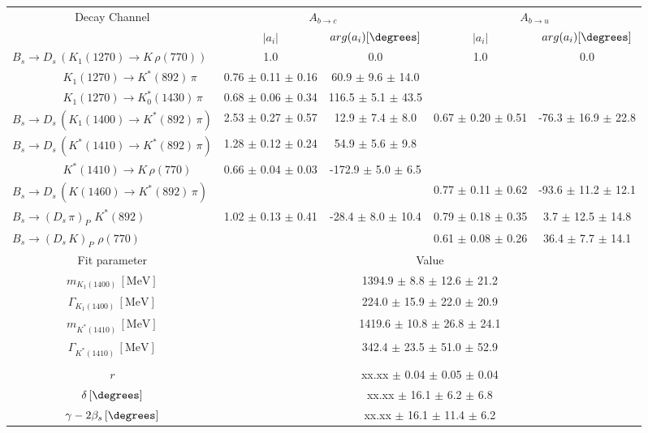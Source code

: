 \begin{tabular}{l c c c c } 
\hline
\hline
\multicolumn{1}{c}{Decay Channel} & \multicolumn{2}{c}{$A_{b \to c}$} & \multicolumn{2}{c}{$A_{b \to u}$}  \\ 
 & \multicolumn{1}{c}{$\vert a_i \vert$}  & \multicolumn{1}{c}{$arg(a_i) [\degrees]$}  & \multicolumn{1}{c}{$\vert a_i \vert$} & \multicolumn{1}{c}{$arg(a_i) [\degrees]$} \\ 
\hline
 $B_s \to D_s \, ( K_1(1270) \to K \, \rho(770) ) $ &  1.0 & 0.0 & 1.0 & 0.0  \\ 
$\phantom{B_s \to D_s \, (} K_1(1270) \to K^{*}(892) \, \pi \phantom{)} $ & 0.76 $\pm$ 0.11 $\pm$ 0.16 & 60.9 $\pm$ 9.6 $\pm$ 14.0 & &   \\ 
$\phantom{B_s \to D_s \, (} K_1(1270) \to K^{*}_{0}(1430) \, \pi \phantom{)} $ & 0.68 $\pm$ 0.06 $\pm$ 0.34 & 116.5 $\pm$ 5.1 $\pm$ 43.5 & &   \\ 
$B_s \to D_s \, ( K_1(1400) \to K^{*}(892) \, \pi ) $ & 2.53 $\pm$ 0.27 $\pm$ 0.57 & 12.9 $\pm$ 7.4 $\pm$ 8.0 & 0.67 $\pm$ 0.20 $\pm$ 0.51 & -76.3 $\pm$ 16.9 $\pm$ 22.8 \\ 
$B_s \to D_s \, ( K^{*}(1410) \to K^{*}(892) \, \pi ) $ & 1.28 $\pm$ 0.12 $\pm$ 0.24 & 54.9 $\pm$ 5.6 $\pm$ 9.8 &  &  \\ 
$\phantom{B_s \to D_s \, (} K^{*}(1410) \to K \, \rho(770) \phantom{)} $ & 0.66 $\pm$ 0.04 $\pm$ 0.03 & -172.9 $\pm$ 5.0 $\pm$ 6.5 & &   \\ 
$B_s \to D_s \, ( K(1460) \to K^{*}(892) \, \pi ) $ & & &0.77 $\pm$ 0.11 $\pm$ 0.62 & -93.6 $\pm$ 11.2 $\pm$ 12.1 \\ 
$B_s \to ( D_s \, \pi)_{P} \, \, K^{*}(892) $ & 1.02 $\pm$ 0.13 $\pm$ 0.41 & -28.4 $\pm$ 8.0 $\pm$ 10.4 & 0.79 $\pm$ 0.18 $\pm$ 0.35 & 3.7 $\pm$ 12.5 $\pm$ 14.8 \\ 
$B_s \to ( D_s \, K)_{P} \, \, \rho(770) $ & & &0.61 $\pm$ 0.08 $\pm$ 0.26 & 36.4 $\pm$ 7.7 $\pm$ 14.1 \\ 
\hline
\hline
\multicolumn{1}{c}{Fit parameter} & \multicolumn{4}{c}{Value}  \\ 
\hline
\multicolumn{1}{c}{$m_{K_1(1400)} \, [\text{MeV}]$} & \multicolumn{4}{c}{1394.9 $\pm$ 8.8 $\pm$ 12.6 $\pm$ 21.2} \\ 
\multicolumn{1}{c}{$\Gamma_{K_1(1400)} \, [\text{MeV}]$} & \multicolumn{4}{c}{224.0 $\pm$ 15.9 $\pm$ 22.0 $\pm$ 20.9} \\ 
\multicolumn{1}{c}{$m_{K^{*}(1410)} \, [\text{MeV}]$} & \multicolumn{4}{c}{1419.6 $\pm$ 10.8 $\pm$ 26.8 $\pm$ 24.1} \\ 
\multicolumn{1}{c}{$\Gamma_{K^{*}(1410)} \, [\text{MeV}]$} & \multicolumn{4}{c}{342.4 $\pm$ 23.5 $\pm$ 51.0 $\pm$ 52.9} \\ 
 \\ 
\multicolumn{1}{c}{$r$} & \multicolumn{4}{c}{xx.xx $\pm$ 0.04 $\pm$ 0.05 $\pm$ 0.04} \\ 
\multicolumn{1}{c}{$\delta \, [\degrees]$} & \multicolumn{4}{c}{xx.xx $\pm$ 16.1 $\pm$ 6.2 $\pm$ 6.8} \\ 
\multicolumn{1}{c}{$\gamma - 2 \beta_{s} \, [\degrees]$} & \multicolumn{4}{c}{xx.xx $\pm$ 16.1 $\pm$ 11.4 $\pm$ 6.2} \\ 
\hline
\hline
\end{tabular}
